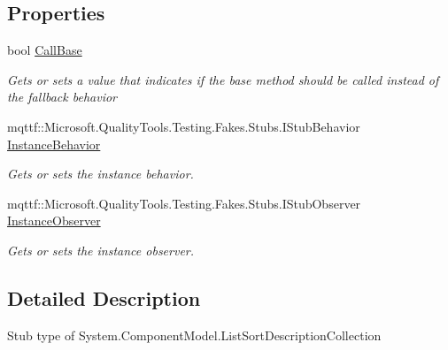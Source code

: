 \subsection*{Properties}
\begin{DoxyCompactItemize}
\item 
bool \hyperlink{class_system_1_1_component_model_1_1_fakes_1_1_stub_list_sort_description_collection_a6594fb8de4e0f44ec75cc06f67c59fc6}{Call\-Base}
\begin{DoxyCompactList}\small\item\em Gets or sets a value that indicates if the base method should be called instead of the fallback behavior\end{DoxyCompactList}\item 
mqttf\-::\-Microsoft.\-Quality\-Tools.\-Testing.\-Fakes.\-Stubs.\-I\-Stub\-Behavior \hyperlink{class_system_1_1_component_model_1_1_fakes_1_1_stub_list_sort_description_collection_abb2b8a99c795482cca3a06f20ca9ad9b}{Instance\-Behavior}
\begin{DoxyCompactList}\small\item\em Gets or sets the instance behavior.\end{DoxyCompactList}\item 
mqttf\-::\-Microsoft.\-Quality\-Tools.\-Testing.\-Fakes.\-Stubs.\-I\-Stub\-Observer \hyperlink{class_system_1_1_component_model_1_1_fakes_1_1_stub_list_sort_description_collection_a2f50a9e2de197d8f74ec071a773508f5}{Instance\-Observer}
\begin{DoxyCompactList}\small\item\em Gets or sets the instance observer.\end{DoxyCompactList}\end{DoxyCompactItemize}


\subsection{Detailed Description}
Stub type of System.\-Component\-Model.\-List\-Sort\-Description\-Collection



